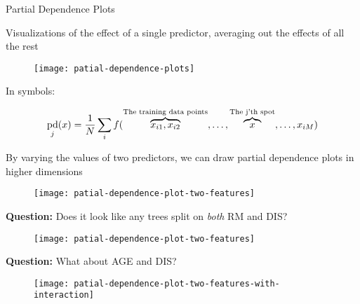 \begin{frame}{Partial Dependence Plots}

Visualizations of the effect of a single predictor, averaging out the effects of all the rest

  \begin{figure}
    \texttt{[image: patial-dependence-plots]}
  \end{figure}

\end{frame}
%
\begin{frame}
In symbols:

$$ \operatorname*{pd}_j(x) = \frac{1}{N} \sum_i f(\overbrace{x_{i1}, x_{i2}}^{\text{The training data points}}, \ldots, \overbrace{x}^{\text{The j'th spot}}, \ldots, x_{iM}) $$
\end{frame}
%
\begin{frame}
By varying the values of two predictors, we can draw partial dependence plots in higher dimensions

  \begin{figure}
    \texttt{[image: patial-dependence-plot-two-features]}
  \end{figure}
 
\end{frame}
%
\begin{frame}
\textbf{Question:} Does it look like any trees split on \textit{both} RM and DIS?

  \begin{figure}
    \texttt{[image: patial-dependence-plot-two-features]}
  \end{figure}
 
\end{frame}
%
\begin{frame}
\textbf{Question:} What about AGE and DIS?

  \begin{figure}
    \texttt{[image: patial-dependence-plot-two-features-with-interaction]}
  \end{figure}
 
\end{frame}